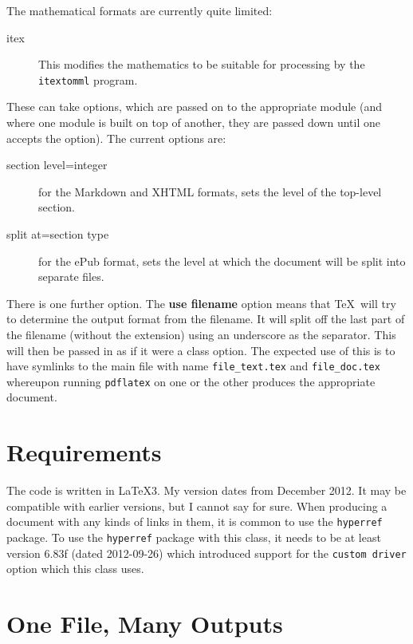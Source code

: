 \documentclass[%
  use filename,
  markdownextra={section level=2}
]{internet}
\begin{document}
The mathematical formats are currently quite limited:

\begin{description}
\item[itex] This modifies the mathematics to be suitable for processing by the \verb+itextomml+ program.
\end{description}

These can take options, which are passed on to the appropriate module (and where one module is built on top of another, they are passed down until one accepts the option).
The current options are:

\begin{description}
\item[section level=integer] for the Markdown and XHTML formats, sets the level of the top-level section.
\item[split at=section type] for the ePub format, sets the level at which the document will be split into separate files.
\end{description}

There is one further option.
The \textbf{use filename} option means that \TeX\ will try to determine the output format from the filename.
It will split off the last part of the filename (without the extension) using an underscore as the separator.
This will then be passed in as if it were a class option.
The expected use of this is to have symlinks to the main file with name \verb+file_text.tex+ and \verb+file_doc.tex+ whereupon running \verb+pdflatex+ on one or the other produces the appropriate document.

\section{Requirements}

The code is written in \LaTeX3.
My version dates from December 2012.
It may be compatible with earlier versions, but I cannot say for sure.
When producing a document with any kinds of links in them, it is common to use the \verb+hyperref+ package.
To use the \verb+hyperref+ package with this class, it needs to be at least version 6.83f (dated 2012-09-26) which introduced support for the \verb+custom driver+ option which this class uses.



\section{One File, Many Outputs}
\end{document}
